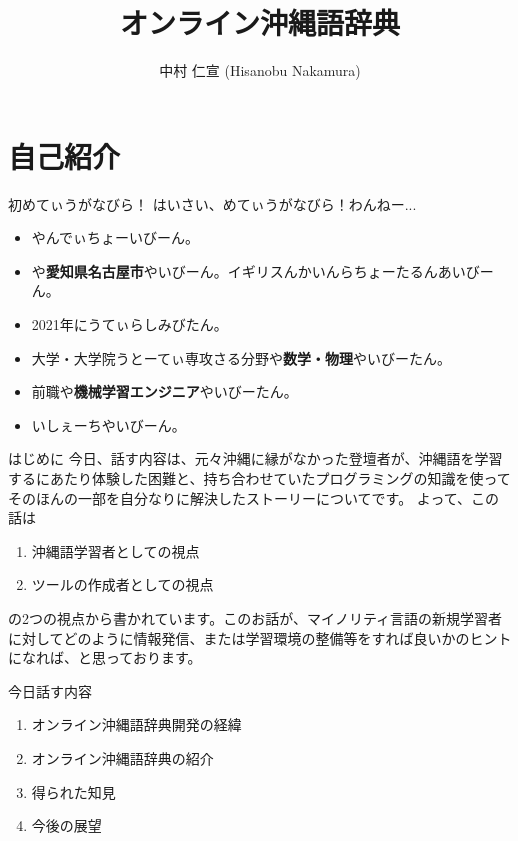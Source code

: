 \documentclass[14pt]{beamer}
\title{オンライン沖縄語辞典}
\author{中村 仁宣 (Hisanobu Nakamura)}
\begin{document}
\begin{frame}
  \maketitle  
\end{frame}

\section{自己紹介}

\begin{frame}{初めてぃうがなびら！}
  はいさい、めてぃうがなびら！わんねー...
    \begin{itemize}
    \item {}や\textbf{}んでぃちょーいびーん。
    \item {}や\textbf{愛知県名古屋市}やいびーん。イギリスんかいんらちょーたるんあいびーん。
    \item 2021年にうてぃらしみびたん。
    \item 大学・大学院うとーてぃ専攻さる分野や\textbf{数学・物理}やいびーたん。
    \item 前職や\textbf{機械学習エンジニア}やいびーたん。
    \item {}いしぇーちやいびーん。
    \end{itemize}
\end{frame}

\begin{frame}{はじめに}
  今日、話す内容は、元々沖縄に縁がなかった登壇者が、沖縄語を学習するにあたり体験した困難と、持ち合わせていたプログラミングの知識を使ってそのほんの一部を自分なりに解決したストーリーについてです。
  よって、この話は
  \begin{enumerate}
  \item {}沖縄語学習者としての視点
  \item ツールの作成者としての視点
  \end{enumerate}
  の2つの視点から書かれています。このお話が、マイノリティ言語の新規学習者に対してどのように情報発信、または学習環境の整備等をすれば良いかのヒントになれば、と思っております。
\end{frame}

\begin{frame}{今日話す内容}
  \begin{enumerate}
  \item オンライン沖縄語辞典開発の経緯
  \item オンライン沖縄語辞典の紹介
  \item 得られた知見
  \item 今後の展望
  \end{enumerate}
\end{frame}
\end{document}
